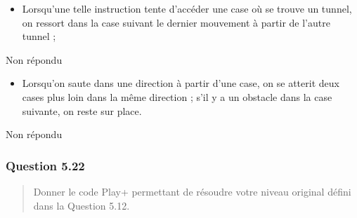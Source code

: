\documentclass[]{article}
\providecommand{\tightlist}{%
  \setlength{\itemsep}{0pt}\setlength{\parskip}{0pt}}
\begin{document}
\begin{itemize}
\tightlist
\item
  Lorsqu'une telle instruction tente d'accéder une case où se trouve un
  tunnel, on ressort dans la case suivant le dernier mouvement à partir
  de l'autre tunnel ;
\end{itemize}

Non répondu

\begin{itemize}
\tightlist
\item
  Lorsqu'on saute dans une direction à partir d'une case, on se atterit
  deux cases plus loin dans la même direction ; s'il y a un obstacle
  dans la case suivante, on reste sur place.
\end{itemize}

Non répondu

\hypertarget{question-5.22}{%
\subsubsection{Question 5.22}\label{question-5.22}}

\begin{quote}
Donner le code Play+ permettant de résoudre votre niveau original défini
dans la Question 5.12.
\end{quote}
\end{document}
